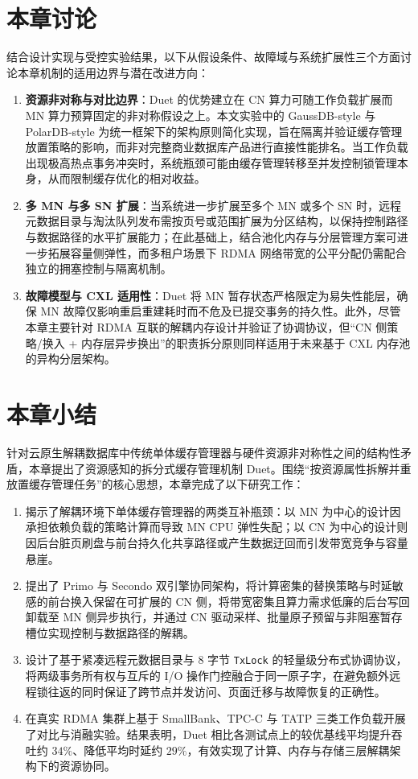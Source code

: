 \section{本章讨论\label{sec:duet.discuss}}
结合设计实现与受控实验结果，以下从假设条件、故障域与系统扩展性三个方面讨论本章机制的适用边界与潜在改进方向：
\begin{enumerate}
    \item \textbf{资源非对称与对比边界}：Duet 的优势建立在 CN 算力可随工作负载扩展而 MN 算力预算固定的非对称假设之上。本文实验中的 GaussDB-style 与 PolarDB-style 为统一框架下的架构原则简化实现，旨在隔离并验证缓存管理放置策略的影响，而非对完整商业数据库产品进行直接性能排名。当工作负载出现极高热点事务冲突时，系统瓶颈可能由缓存管理转移至并发控制锁管理本身，从而限制缓存优化的相对收益。
    \item \textbf{多 MN 与多 SN 扩展}：当系统进一步扩展至多个 MN 或多个 SN 时，远程元数据目录与淘汰队列发布需按页号或范围扩展为分区结构，以保持控制路径与数据路径的水平扩展能力\cite{yangPolardb2024,liGaussdb2024}；在此基础上，结合池化内存与分层管理方案可进一步拓展容量侧弹性\cite{liPond2023,zhongManaging2024}，而多租户场景下 RDMA 网络带宽的公平分配仍需配合独立的拥塞控制与隔离机制\cite{guoRdma2016}。
    \item \textbf{故障模型与 CXL 适用性}：Duet 将 MN 暂存状态严格限定为易失性能层，确保 MN 故障仅影响重启重建耗时而不危及已提交事务的持久性。此外，尽管本章主要针对 RDMA 互联的解耦内存设计并验证了协调协议，但“CN 侧策略/换入 + 内存层异步换出”的职责拆分原则同样适用于未来基于 CXL 内存池的异构分层架构。
\end{enumerate}

\section{本章小结\label{sec:duet.conc}}
针对云原生解耦数据库中传统单体缓存管理器与硬件资源非对称性之间的结构性矛盾，本章提出了资源感知的拆分式缓存管理机制 Duet。围绕“按资源属性拆解并重放置缓存管理任务”的核心思想，本章完成了以下研究工作：
\begin{enumerate}
    \item 揭示了解耦环境下单体缓存管理器的两类互补瓶颈：以 MN 为中心的设计因承担依赖负载的策略计算而导致 MN CPU 弹性失配；以 CN 为中心的设计则因后台脏页刷盘与前台持久化共享路径或产生数据迂回而引发带宽竞争与容量悬崖。
    \item 提出了 Primo 与 Secondo 双引擎协同架构，将计算密集的替换策略与时延敏感的前台换入保留在可扩展的 CN 侧，将带宽密集且算力需求低廉的后台写回卸载至 MN 侧异步执行，并通过 CN 驱动采样、批量原子预留与非阻塞暂存槽位实现控制与数据路径的解耦。
    \item 设计了基于紧凑远程元数据目录与 8 字节 \texttt{TxLock} 的轻量级分布式协调协议，将两级事务所有权与互斥的 I/O 操作门控融合于同一原子字，在避免额外远程锁往返的同时保证了跨节点并发访问、页面迁移与故障恢复的正确性。
    \item 在真实 RDMA 集群上基于 SmallBank、TPC-C 与 TATP 三类工作负载开展了对比与消融实验。结果表明，Duet 相比各测试点上的较优基线平均提升吞吐约 $34\%$、降低平均时延约 $29\%$，有效实现了计算、内存与存储三层解耦架构下的资源协同。
\end{enumerate}
